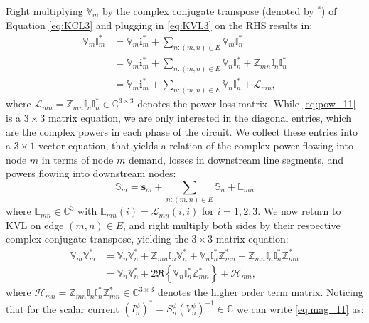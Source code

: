 Right multiplying $\mathbb{V}_{m}$ by the complex conjugate transpose (denoted by $^*$) of Equation \eqref{eq:KCL3} and plugging in \eqref{eq:KVL3} on the RHS results in:
\begin{align}
	\mathbb{V}_{m} \mathbb{I}_{m}^{*} &= \mathbb{V}_{m}\mathbf{i}_{m}^{*} + \sum_{n:(m,n) \in E} \mathbb{V}_{m} \mathbb{I}_{n}^{*} \nonumber \\
	&= \mathbb{V}_{m}  \mathbf{i}_{m}^{*} + \sum_{n:(m,n) \in E} \mathbb{V}_{n}  \mathbb{I}_{n}^{*} + \mathbb{Z}_{mn} \mathbb{I}_{n} \mathbb{I}_{n}^{*} \label{eq:pow_11} \\
    &= \mathbb{V}_{m}  \mathbf{i}_{m}^{*} + \sum_{n:(m,n) \in E} \mathbb{V}_{n}  \mathbb{I}_{n}^{*} + \mathcal L_{mn} \label{eq:pow_11},
\end{align}
where $\mathcal L_{mn} = \mathbb{Z}_{mn} \mathbb{I}_{n} \mathbb{I}_{n}^{*} \in \mathbb C^{3 \times 3}$ denotes the power loss matrix.
While \eqref{eq:pow_11} is a $3 \times 3$ matrix equation, we are only interested in the diagonal entries, which are the complex powers in each phase of the circuit.  We collect these entries into a $3 \times 1$ vector  equation, that yields a relation of the complex power flowing into node $m$ in terms of node $m$ demand, losses in downstream line segments, and powers flowing into downstream nodes:
\begin{equation}
	\mathbb{S}_{m} = \mathbf{s}_{m} + \sum_{n:(m,n) \in E} \mathbb{S}_{n} + \mathbb{L}_{mn}
    \label{eq:pow_12}
\end{equation}
\noindent where $\mathbb{L}_{mn} \in \mathbb{C}^{3}$ with $\mathbb{L}_{mn}(i) = \mathcal L_{mn}(i,i)$ for $i = 1,2,3$. We now return to KVL on edge $(m,n) \in E$, and right multiply both sides by their respective complex conjugate transpose, yielding the $3 \times 3$ matrix equation:
\begin{align}
	\mathbb{V}_{m} \mathbb{V}_{m}^*  & =  \mathbb{V}_{n} \mathbb{V}_{n}^* + \mathbb{Z}_{mn} \mathbb{I}_{n} \mathbb{V}_{n}^* + \mathbb{V}_{n} \mathbb{I}_{n}^{*} \mathbb{Z}_{mn}^{*} + \mathbb{Z}_{mn} \mathbb{I}_{n} \mathbb{I}_{n}^{*} \mathbb{Z}_{mn}^{*} \nonumber \\
    & = \mathbb{V}_{n} \mathbb{V}_{n}^* + 2 \Re \left\{\mathbb{V}_{n} \mathbb{I}_{n}^{*} \mathbb{Z}_{mn}^{*} \right\} + \mathcal H_{mn},
\label{eq:mag_11}
\end{align}
where $\mathcal H_{mn} = \mathbb{Z}_{mn} \mathbb{I}_{n} \mathbb{I}_{n}^{*} \mathbb{Z}_{mn}^{*} \in \mathbb C^{3 \times 3}$ denotes the higher order term matrix.  Noticing that for the scalar current $(I^{\phi}_{n})^* = S_{n}^{\phi} (V_{n}^{\phi})^{-1} \in \mathbb C$  we can write \eqref{eq:mag_11} as:
